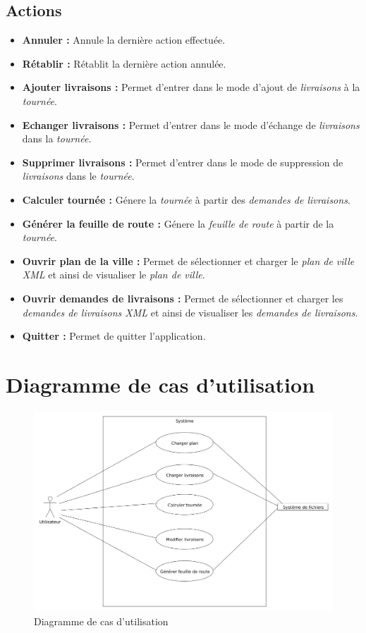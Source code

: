 \documentclass[10pt,a4paper]{book}
\begin{document}
\subsection{Actions}
\begin{itemize}
\item \textbf{Annuler :} Annule la dernière action effectuée. \vskip1mm
\item \textbf{Rétablir :} Rétablit la dernière action annulée. \vskip1mm
\item \textbf{Ajouter livraisons :} Permet d'entrer dans le mode d'ajout de \textit{livraisons} à la \textit{tournée}. \vskip1mm
\item \textbf{Echanger livraisons :} Permet d'entrer dans le mode d'échange de \textit{livraisons} dans la \textit{tournée}. \vskip1mm
\item \textbf{Supprimer livraisons :} Permet d'entrer dans le mode de suppression de \textit{livraisons} dans le \textit{tournée}. \vskip1mm
\item \textbf{Calculer tournée :} Génere la \textit{tournée} à partir des \textit{demandes de livraisons}. \vskip1mm
\item \textbf{Générer la feuille de route :} Génere la \textit{feuille de route} à partir de la \textit{tournée}. \vskip1mm
\item \textbf{Ouvrir plan de la ville :} Permet de sélectionner et charger le \textit{plan de ville XML} et ainsi de visualiser le \textit{plan de ville}. \vskip1mm
\item \textbf{Ouvrir demandes de livraisons :} Permet de sélectionner et charger les \textit{demandes de livraisons XML} et ainsi de visualiser les \textit{demandes de livraisons}. \vskip1mm
\item \textbf{Quitter :} Permet de quitter l'application. \vskip1mm
\end{itemize}
\section{Diagramme de cas d'utilisation}
\begin{figure}[h!]
    \centering
    \includegraphics[scale=0.28]{cu.png}
    \caption{Diagramme de cas d'utilisation}
\end{figure}
\end{document}
